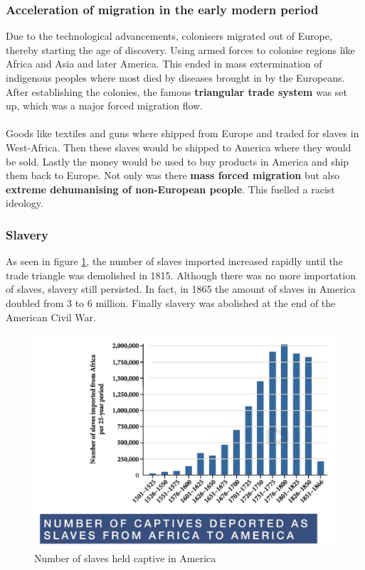 \documentclass[../summary.tex]{subfiles}
\begin{document}
\subsubsection{Acceleration of migration in the early modern period}
Due to the technological advancements, colonisers migrated out of Europe, thereby starting the age of discovery. Using armed forces to colonise regions like Africa and Asia and later America. This ended in mass extermination of indigenous peoples where most died by diseases brought in by the Europeans. After establishing the colonies, the famous \textbf{triangular trade system} was set up, which was a major forced migration flow.
\\\\
Goods like textiles and guns where shipped from Europe and traded for slaves in West-Africa. Then these slaves would be shipped to America where they would be sold. Lastly the money would be used to buy products in America and ship them back to Europe. Not only was there \textbf{mass forced migration} but also \textbf{extreme dehumanising of non-European people}. This fuelled a racist ideology.
\newpage
\subsubsection{Slavery}
As seen in figure \ref{fig:slaves-captive}, the number of slaves imported increased rapidly until the trade triangle was demolished in 1815. Although there was no more importation of slaves, slavery still persisted. In fact, in 1865 the amount of slaves in America doubled from 3 to 6 million. Finally slavery was abolished at the end of the American Civil War.

\begin{figure}[h]
	\centering
	\includegraphics[width=0.7\linewidth]{../images/7-slaves-captive}
	\caption{Number of slaves held captive in America}
	\label{fig:slaves-captive}
\end{figure}
\end{document}
